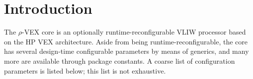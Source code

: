 \documentclass[10pt]{article}
\newcommand{\rvex}{$\rho$-VEX}
\begin{document}
\setcounter{page}{1}

\tableofcontents
\clearpage

\section{Introduction}

The \rvex{} core is an optionally runtime-reconfigurable VLIW processor based on the HP VEX architecture. Aside from being runtime-reconfigurable, the core has several design-time configurable parameters by means of generics, and many more are available through package constants. A coarse list of configuration parameters is listed below; this list is not exhaustive.
\end{document}
